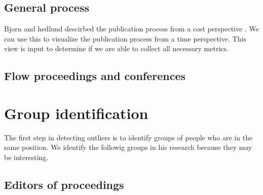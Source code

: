 \documentclass{ou-report}
\begin{document}





\section{General process}
Bjorn and hedlund descirbed the publication process from a cost perspective 
\cite{BH2004}. We can use this to visualize the publication process from a time 
perspective. This view is input to determine if we are able to collect all 
necessary metrics.



\section{Flow proceedings and conferences}


\chapter{Group identification}
The first step in detecting outliers is to identify groups of people who are in 
the same position. We identify the followig groups in his research because they
may be interesting.

\section{Editors of proceedings}
\end{document}
